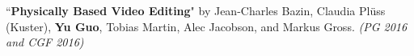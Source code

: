 \documentclass[margin,line]{resume}
\begin{document}
\begin{resume}
	``\textbf{Physically Based Video Editing}" 
	by Jean-Charles Bazin, Claudia Pl\"{u}ss (Kuster), \textbf{Yu Guo}, Tobias Martin, Alec Jacobson, and Markus Gross. 
	\textsl{(PG 2016 and CGF 2016)}\\
	
	\vspace{-5mm}
	
%	
%	
%	
	
%	
	
%	
%	
%	
	




\end{resume}
\end{document}
